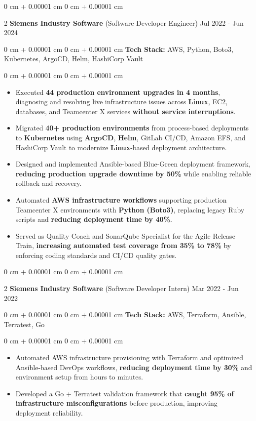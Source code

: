 \documentclass[9pt, letterpaper]{article}
\newenvironment{highlights}{
    \begin{itemize}[
        topsep=0.05 cm,
        parsep=0 pt,
        partopsep=0pt,
        itemsep=0pt,
        leftmargin=10pt
    ]
}{
    \end{itemize}
} %
\newenvironment{onecolentry}{
    \begin{adjustwidth}{
        0 cm + 0.00001 cm}{
        0 cm + 0.00001 cm}
}{
    \end{adjustwidth}
} %
\newenvironment{twocolentry}[2][]{
    \onecolentry
    \def\secondColumn{#2}
    \setcolumnwidth{\fill, 4.5 cm}
    \begin{paracol}{2}
}{
    \switchcolumn \raggedleft \secondColumn
    \end{paracol}
    \endonecolentry
} %
\begin{document}
    \begin{twocolentry}{Jul 2022 - Jun 2024}\textbf{Siemens Industry Software} (Software Developer Engineer)\end{twocolentry}
    \begin{onecolentry}\textbf{Tech Stack:} AWS, Python, Boto3, Kubernetes, ArgoCD, Helm, HashiCorp Vault \end{onecolentry}
    \begin{onecolentry}
        \begin{highlights}
            \item Executed \textbf{44 production environment upgrades in 4 months}, diagnosing and resolving live infrastructure issues across \textbf{Linux}, EC2, databases, and Teamcenter X services \textbf{without service interruptions}.
            \item Migrated \textbf{40+ production environments} from process-based deployments to \textbf{Kubernetes} using \textbf{ArgoCD}, \textbf{Helm}, GitLab CI/CD, Amazon EFS, and HashiCorp Vault to modernize \textbf{Linux}-based deployment architecture.
            \item Designed and implemented Ansible-based Blue-Green deployment framework, \textbf{reducing production upgrade downtime by 50\%} while enabling reliable rollback and recovery.
            \item Automated \textbf{AWS infrastructure workflows} supporting production Teamcenter X environments with \textbf{Python (Boto3)}, replacing legacy Ruby scripts and \textbf{reducing deployment time by 40\%}.
            \item Served as Quality Coach and SonarQube Specialist for the Agile Release Train, \textbf{increasing automated test coverage from 35\% to 78\%} by enforcing coding standards and CI/CD quality gates.
        \end{highlights}
    \end{onecolentry}
    \vspace{0.04 cm}

    \begin{twocolentry}{Mar 2022 - Jun 2022}\textbf{Siemens Industry Software} (Software Developer Intern)\end{twocolentry}
    \begin{onecolentry}\textbf{Tech Stack:} AWS, Terraform, Ansible, Terratest, Go \end{onecolentry}
    \begin{onecolentry}
        \begin{highlights}
            \item Automated AWS infrastructure provisioning with Terraform and optimized Ansible-based DevOps workflows, \textbf{reducing deployment time by 30\%} and environment setup from hours to minutes.
            \item Developed a Go + Terratest validation framework that \textbf{caught 95\% of infrastructure misconfigurations} before production, improving deployment reliability.
        \end{highlights}
    \end{onecolentry}
    \vspace{0.04 cm}
\end{document}
